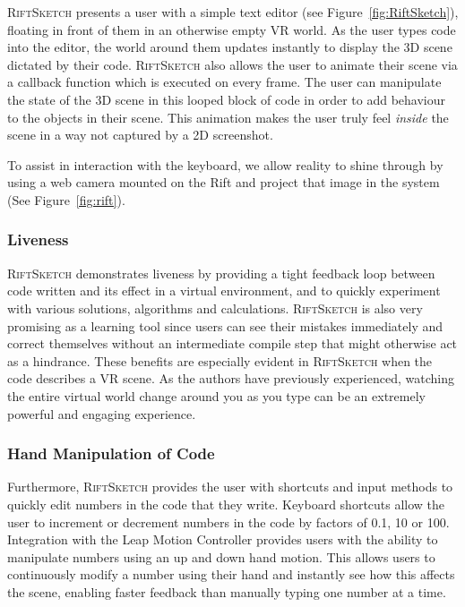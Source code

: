 \documentclass[conference]{IEEEtran}
\begin{document}
\textsc{RiftSketch} presents a user with a simple text editor (see Figure~\ref{fig:RiftSketch}), floating in front of them in an otherwise empty VR world. 
As the user types code into the editor, the world around them updates instantly to display the 3D scene dictated by their code. 
\textsc{RiftSketch} also allows the user to animate their scene via a callback function which is executed on every frame. 
The user can manipulate the state of the 3D scene in this looped block of code in order to add behaviour to the objects in their scene.
This animation makes the user truly feel \emph{inside} the scene in a way not captured by a 2D screenshot.

To assist in interaction with the keyboard, we allow reality to shine through by using a web camera mounted on the Rift and project that image in the system (See Figure~\ref{fig:rift}).



\subsubsection{Liveness}

\textsc{RiftSketch} demonstrates liveness by providing a tight feedback loop between code written and its effect in a virtual environment, and to quickly experiment with various solutions, algorithms and calculations. 
\textsc{RiftSketch} is also very promising as a learning tool since users can see their mistakes immediately and correct themselves without an intermediate compile step that might otherwise act as a hindrance.  
These benefits are especially evident in \textsc{RiftSketch} when the code describes a VR scene. 
As the authors have previously experienced, watching the entire virtual world change around you as you type can be an extremely powerful and engaging experience.

\subsubsection{Hand Manipulation of Code}

Furthermore, \textsc{RiftSketch} provides the user with shortcuts and input methods to quickly edit numbers in the code that they write. 
Keyboard shortcuts allow the user to increment or decrement numbers in the code by factors of 0.1, 10 or 100. 
Integration with the Leap Motion Controller provides users with the ability to manipulate numbers using an up and down hand motion.
This allows users to continuously modify a number using their hand and instantly see how this affects the scene, enabling faster feedback than manually typing one number at a time.
\end{document}
